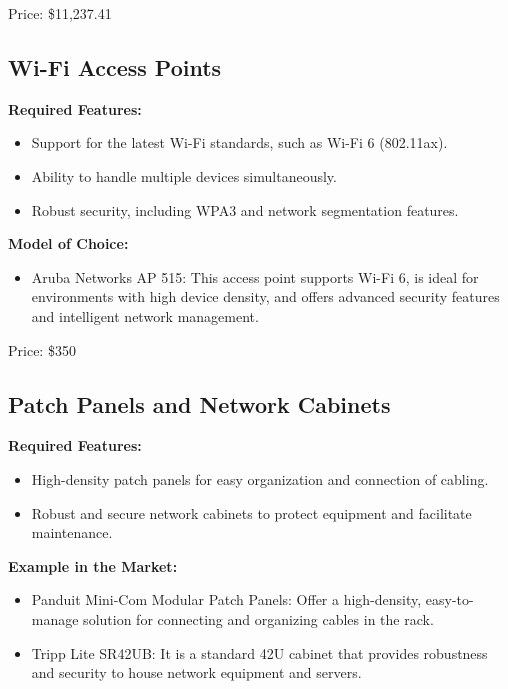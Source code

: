 \documentclass[12pt]{article}
\begin{document}
Price: \$11,237.41 \cite{itprice}

\subsection{Wi-Fi Access Points}

\textbf{Required Features:}

\begin{itemize}
    \item Support for the latest Wi-Fi standards, such as Wi-Fi 6 (802.11ax).
    \item Ability to handle multiple devices simultaneously.
    \item Robust security, including WPA3 and network segmentation features.
\end{itemize}

\textbf{Model of Choice:}

\begin{itemize}
    \item Aruba Networks AP 515: This access point supports Wi-Fi 6, is ideal for environments with high device density, and offers advanced security features and intelligent network management.
\end{itemize}

Price: \$350 \cite{amazon2}

\subsection{Patch Panels and Network Cabinets}

\textbf{Required Features:}

\begin{itemize}
    \item High-density patch panels for easy organization and connection of cabling.
    \item Robust and secure network cabinets to protect equipment and facilitate maintenance.
\end{itemize}

\textbf{Example in the Market:}

\begin{itemize}
    \item Panduit Mini-Com Modular Patch Panels: Offer a high-density, easy-to-manage solution for connecting and organizing cables in the rack.
    \item Tripp Lite SR42UB: It is a standard 42U cabinet that provides robustness and security to house network equipment and servers.
\end{itemize}
\end{document}
